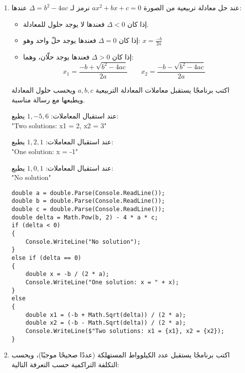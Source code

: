 ﻿\documentclass[12pt]{article}
\begin{document}
\begin{enumerate}[itemsep=3em]
\begin{enumerate}
\item
عند حل معادلة تربيعية من الصورة $ax^2 + bx + c = 0$
نرمز لـ $\Delta = b^2 - 4ac$ عندها:
\begin{itemize}
    \item إذا كان $\Delta < 0$ فعندها لا يوجد حلول للمعادلة.
    \item إذا كان $\Delta = 0$ فعندها يوجد حلّ واحد وهو:
    \( x = \frac{-b}{2a} \)
    \item إذا كان $\Delta > 0$ فعندها يوجد حلّان، وهما:
    \[ x_1 = \frac{-b + \sqrt{b^2 - 4ac}}{2a} \qquad x_2 = \frac{-b - \sqrt{b^2 - 4ac}}{2a} \]
\end{itemize}%

 اكتب برنامجًا يستقبل معاملات المعادلة التربيعية $a,b,c$ ويحسب حلول المعادلة ويطبعها مع رسالة مناسبة.

 \ifdetailed
 \begin{boxExample}[1]
 عند استقبال المعاملات: $1, -5, 6$ يطبع: \\ "\textenglish{Two solutions: x1 = 2, x2 = 3}"
 \end{boxExample}
 \begin{boxExample}[2]
 عند استقبال المعاملات: $1, 2, 1$ يطبع: \\ "\textenglish{One solution: x = -1}"
 \end{boxExample}
 \begin{boxExample}[3]
 عند استقبال المعاملات: $1, 0, 1$ يطبع: \\ "\textenglish{No solution}"
 \end{boxExample}

\ifwithsols
\begin{boxSolution}
\begin{english}
\begin{verbatim}
double a = double.Parse(Console.ReadLine());
double b = double.Parse(Console.ReadLine());
double c = double.Parse(Console.ReadLine());
double delta = Math.Pow(b, 2) - 4 * a * c;
if (delta < 0)
{
    Console.WriteLine("No solution");
}
else if (delta == 0)
{
    double x = -b / (2 * a);
    Console.WriteLine("One solution: x = " + x);
}
else
{
    double x1 = (-b + Math.Sqrt(delta)) / (2 * a);
    double x2 = (-b - Math.Sqrt(delta)) / (2 * a);
    Console.WriteLine($"Two solutions: x1 = {x1}, x2 = {x2});
}
\end{verbatim}
\end{english}
\end{boxSolution}
\clearpage
\fi
\fi


\item
اكتب برنامجًا يستقبل عدد الكيلوواط المستهلكة (عددًا صحيحًا موجبًا)، ويحسب التكلفة التراكمية حسب التعرفة التالية:


\end{enumerate}
\end{enumerate}
\end{document}
